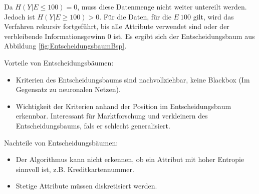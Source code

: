 Da \(H(Y|E \leq 100) = 0\), muss diese Datenmenge nicht weiter untereilt werden.
Jedoch ist \(H(Y|E \geq 100) > 0\).
Für die Daten, für die \(E \> 100\) gilt, wird das Verfahren rekursiv fortgeführt, bis alle Attribute verwendet sind oder der verbleibende Informationsgewinn 0 ist.
Es ergibt sich der Entscheidungsbaum aus Abbildung \ref{fig:EntscheidungsbaumBsp}.

Vorteile von Entscheidungsbäumen:
\begin{itemize}
	\item Kriterien des Entscheidungsbaums sind nachvollziehbar, keine Blackbox (Im Gegensatz zu neuronalen Netzen). 
	\item Wichtigkeit der Kriterien anhand der Position im Entscheidungsbaum erkennbar.
		Interessant für Marktforschung und verkleinern des Entscheidungsbaums, fals er schlecht generalisiert.
\end{itemize}
Nachteile von Entscheidungsbäumen:
\begin{itemize}
	\item Der Algorithmus kann nicht erkennen, ob ein Attribut mit hoher Entropie sinnvoll ist, z.B. Kreditkartennummer.
	\item Stetige Attribute müssen diskretisiert werden.
\end{itemize}

